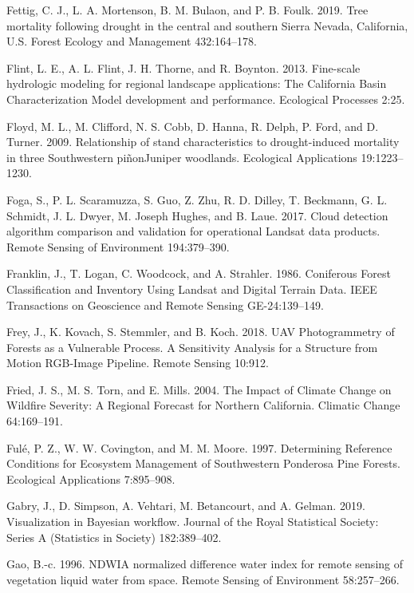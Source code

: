 \documentclass[twoside,12pt,final]{ucthesis-CA2012}
\begin{document}
\begin{ucmainmatter}
\hypertarget{ref-fettig2019}{}
Fettig, C. J., L. A. Mortenson, B. M. Bulaon, and P. B. Foulk. 2019.
Tree mortality following drought in the central and southern Sierra
Nevada, California, U.S. Forest Ecology and Management 432:164--178.

\hypertarget{ref-flint2013}{}
Flint, L. E., A. L. Flint, J. H. Thorne, and R. Boynton. 2013.
Fine-scale hydrologic modeling for regional landscape applications: The
California Basin Characterization Model development and performance.
Ecological Processes 2:25.

\hypertarget{ref-floyd2009}{}
Floyd, M. L., M. Clifford, N. S. Cobb, D. Hanna, R. Delph, P. Ford, and
D. Turner. 2009. Relationship of stand characteristics to
drought-induced mortality in three Southwestern piñonJuniper woodlands.
Ecological Applications 19:1223--1230.

\hypertarget{ref-foga2017}{}
Foga, S., P. L. Scaramuzza, S. Guo, Z. Zhu, R. D. Dilley, T. Beckmann,
G. L. Schmidt, J. L. Dwyer, M. Joseph Hughes, and B. Laue. 2017. Cloud
detection algorithm comparison and validation for operational Landsat
data products. Remote Sensing of Environment 194:379--390.

\hypertarget{ref-franklin1986}{}
Franklin, J., T. Logan, C. Woodcock, and A. Strahler. 1986. Coniferous
Forest Classification and Inventory Using Landsat and Digital Terrain
Data. IEEE Transactions on Geoscience and Remote Sensing GE-24:139--149.

\hypertarget{ref-frey2018}{}
Frey, J., K. Kovach, S. Stemmler, and B. Koch. 2018. UAV Photogrammetry
of Forests as a Vulnerable Process. A Sensitivity Analysis for a
Structure from Motion RGB-Image Pipeline. Remote Sensing 10:912.

\hypertarget{ref-fried2004}{}
Fried, J. S., M. S. Torn, and E. Mills. 2004. The Impact of Climate
Change on Wildfire Severity: A Regional Forecast for Northern
California. Climatic Change 64:169--191.

\hypertarget{ref-fule1997}{}
Fulé, P. Z., W. W. Covington, and M. M. Moore. 1997. Determining
Reference Conditions for Ecosystem Management of Southwestern Ponderosa
Pine Forests. Ecological Applications 7:895--908.

\hypertarget{ref-gabry2019}{}
Gabry, J., D. Simpson, A. Vehtari, M. Betancourt, and A. Gelman. 2019.
Visualization in Bayesian workflow. Journal of the Royal Statistical
Society: Series A (Statistics in Society) 182:389--402.

\hypertarget{ref-gao1996}{}
Gao, B.-c. 1996. NDWIA normalized difference water index for remote
sensing of vegetation liquid water from space. Remote Sensing of
Environment 58:257--266.


\end{ucmainmatter}
\end{document}
